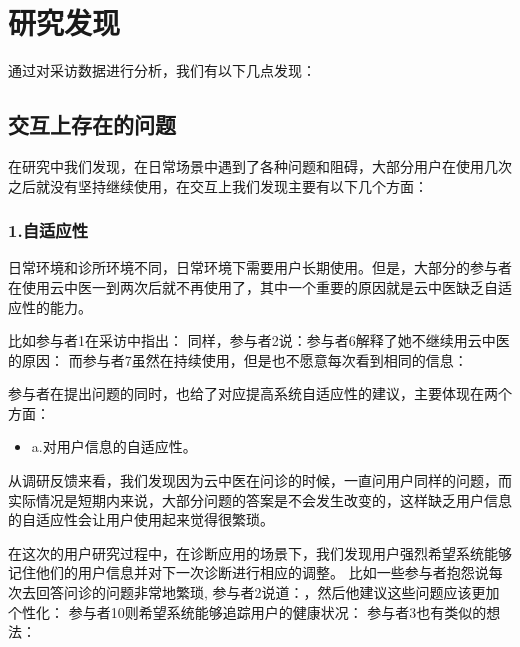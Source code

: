 \section{研究发现}

通过对采访数据进行分析，我们有以下几点发现：

\subsection{交互上存在的问题}

在研究中我们发现，在日常场景中遇到了各种问题和阻碍，大部分用户在使用几次之后就没有坚持继续使用，在交互上我们发现主要有以下几个方面：

\subsubsection{1.自适应性}

日常环境和诊所环境不同，日常环境下需要用户长期使用。但是，大部分的参与者在使用云中医一到两次后就不再使用了，其中一个重要的原因就是云中医缺乏自适应性的能力。

比如参与者1在采访中指出：
同样，参与者2说：参与者6解释了她不继续用云中医的原因：
而参与者7虽然在持续使用，但是也不愿意每次看到相同的信息：

参与者在提出问题的同时，也给了对应提高系统自适应性的建议，主要体现在两个方面：

\begin{itemize}
\item a.对用户信息的自适应性。
\end{itemize}

从调研反馈来看，我们发现因为云中医在问诊的时候，一直问用户同样的问题，而实际情况是短期内来说，大部分问题的答案是不会发生改变的，这样缺乏用户信息的自适应性会让用户使用起来觉得很繁琐。

在这次的用户研究过程中，在诊断应用的场景下，我们发现用户强烈希望系统能够记住他们的用户信息并对下一次诊断进行相应的调整。
比如一些参与者抱怨说每次去回答问诊的问题非常地繁琐, 参与者2说道：，然后他建议这些问题应该更加个性化：
参与者10则希望系统能够追踪用户的健康状况：
参与者3也有类似的想法：

